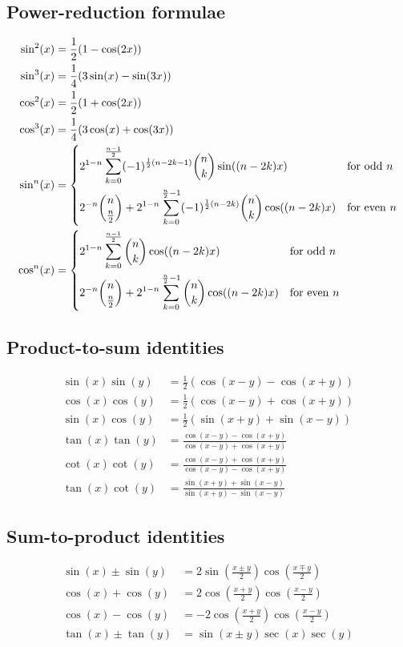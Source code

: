 \documentclass{article}
\begin{document}
\subsection{Power-reduction formulae}
\begin{align}
\sin^2(x)&=\frac{1}{2}(1-\cos(2x))\\
\sin^3(x)&=\frac{1}{4}(3\sin(x)-\sin(3x))\\
\cos^2(x)&=\frac{1}{2}(1+\cos(2x))\\
\cos^3(x)&=\frac{1}{4}(3\cos(x)+\cos(3x))\\
\sin^n(x)&=
\begin{dcases}
2^{1-n}\sum_{k=0}^{\frac{n-1}{2}}(-1)^{\frac{1}{2}(n-2k-1)}\binom{n}{k}\sin((n-2k)x)&\mathrm{for\ odd\ }n\\
2^{-n}\binom{n}{\frac{n}{2}}+2^{1-n}\sum_{k=0}^{\frac{n}{2}-1}(-1)^{\frac{1}{2}(n-2k)}\binom{n}{k}\cos((n-2k)x)&\mathrm{for\ even\ }n
\end{dcases}
\\
\cos^n(x)&=
\begin{dcases}
2^{1-n}\sum_{k=0}^{\frac{n-1}{2}}\binom{n}{k}\cos((n-2k)x)&\mathrm{for\ odd\ }n\\
2^{-n}\binom{n}{\frac{n}{2}}+2^{1-n}\sum_{k=0}^{\frac{n}{2}-1}\binom{n}{k}\cos((n-2k)x)&\mathrm{for\ even\ }n
\end{dcases}
\end{align}

\subsection{Product-to-sum identities}
\begin{align}
\sin(x)\sin(y)&=\frac{1}{2}(\cos(x-y)-\cos(x+y))\\
\cos(x)\cos(y)&=\frac{1}{2}(\cos(x-y)+\cos(x+y))\\
\sin(x)\cos(y)&=\frac{1}{2}(\sin(x+y)+\sin(x-y))\\
\tan(x)\tan(y)&=\frac{\cos(x-y)-\cos(x+y)}{\cos(x-y)+\cos(x+y)}\\
\cot(x)\cot(y)&=\frac{\cos(x-y)+\cos(x+y)}{\cos(x-y)-\cos(x+y)}\\
\tan(x)\cot(y)&=\frac{\sin(x+y)+\sin(x-y)}{\sin(x+y)-\sin(x-y)}
\end{align}

\subsection{Sum-to-product identities}
\begin{align}
\sin(x)\pm\sin(y)&=2\sin\left(\frac{x\pm y}{2}\right)\cos\left(\frac{x\mp y}{2}\right)\\
\cos(x)+\cos(y)&=2\cos\left(\frac{x+y}{2}\right)\cos\left(\frac{x-y}{2}\right)\\
\cos(x)-\cos(y)&=-2\cos\left(\frac{x+y}{2}\right)\cos\left(\frac{x-y}{2}\right)\\
\tan(x)\pm\tan(y)&=\sin(x\pm y)\sec(x)\sec(y)
\end{align}
\end{document}
